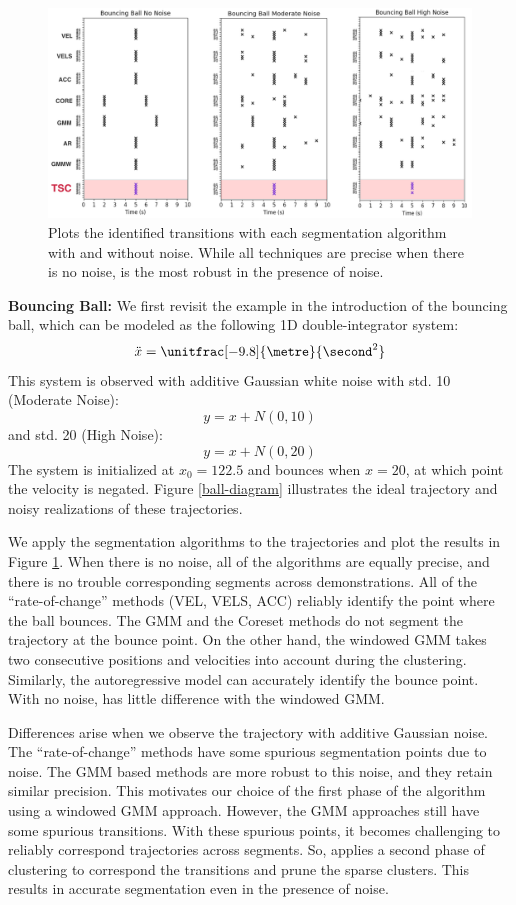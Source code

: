 \begin{figure}[ht!]
\centering
\includegraphics[width=\columnwidth]{tsc-experiments/ball-results.png}
\caption{Plots the identified transitions with each segmentation algorithm with and without noise. While all techniques are precise when there is no noise, \tsc is the most robust in the presence of noise. \label{ball-results}}
\end{figure}


\textbf{Bouncing Ball: }
We first revisit the example in the introduction of the bouncing ball, which can be modeled as the following 1D double-integrator system:
\[ \ddot{x} = \unitfrac[-9.8]{\metre}{\second^2} \]
This system is observed with additive Gaussian white noise with std. 10 (Moderate Noise):
\[
y = x + N(0,10)
\]
and std. 20 (High Noise):
\[
y = x + N(0,20)
\]
The system is initialized at $x_0 = 122.5$ and bounces when $x=20$, at which point the velocity is negated.
Figure \ref{ball-diagram} illustrates the ideal trajectory and noisy realizations of these trajectories.

We apply the segmentation algorithms to the trajectories and plot the results in Figure \ref{ball-results}.
When there is no noise, all of the algorithms are equally precise, and there is no trouble corresponding segments across demonstrations.
All of the ``rate-of-change'' methods (VEL, VELS, ACC) reliably identify the point where the ball bounces.
The GMM and the Coreset methods do not segment the trajectory at the bounce point. 
On the other hand, the windowed GMM takes two consecutive positions and velocities into account during the clustering.
Similarly, the autoregressive model can accurately identify the bounce point.
With no noise, \tsc has little difference with the windowed GMM.

Differences arise when we observe the trajectory with additive Gaussian noise.
The ``rate-of-change'' methods have some spurious segmentation points due to noise. 
The GMM based methods are more robust to this noise, and they retain similar precision.
This motivates our choice of the first phase of the \tsc algorithm using a windowed GMM approach.
However, the GMM approaches still have some spurious transitions.
With these spurious points, it becomes challenging to reliably correspond trajectories across segments.
So, \tsc applies a second phase of clustering to correspond the transitions and prune the sparse clusters.
This results in accurate segmentation even in the presence of noise.

